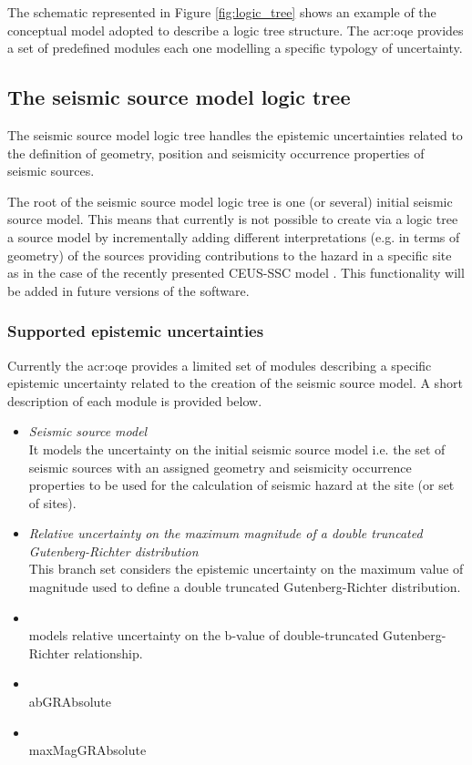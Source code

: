 The schematic represented in Figure \ref{fig:logic_tree} shows an example of 
the conceptual model adopted to describe a logic tree structure. The
\gls{acr:oqe} provides a set of predefined modules each one modelling a 
specific typology of uncertainty. 
%
\subsection{The seismic source model logic tree}
The seismic source model logic tree handles the epistemic uncertainties
related to the definition of geometry, position and seismicity occurrence 
properties of seismic sources. 

The root of the seismic source model logic tree is one (or several) initial 
seismic source model. This means that currently is not possible to create via 
a logic tree a source model by incrementally adding different 
interpretations (e.g. in terms  of geometry) of the sources providing 
contributions to the hazard in a specific site as in the case of the 
recently presented CEUS-SSC model \parencite{ceus2012}. 
%
This functionality will be added in future versions of the software.
%
\subsubsection{Supported epistemic uncertainties}
Currently the \gls{acr:oqe} provides a limited set of modules describing a 
specific epistemic uncertainty related to the creation of the seismic source 
model. A short description of each module is provided below.
\begin{itemize}
    \item \emph{Seismic source model} \hfill \\
        It models the uncertainty on the initial seismic source model i.e.
        the set of seismic sources with an assigned geometry and seismicity 
        occurrence properties to be used for the calculation of seismic 
        hazard at the site (or set of sites).
    \item \emph{Relative uncertainty on the maximum magnitude of a double 
            truncated Gutenberg-Richter distribution} \hfill \\ 
        This branch set considers the epistemic uncertainty on the maximum 
        value of magnitude used to define a double truncated Gutenberg-Richter 
        distribution.
    \item \emph{} \hfill \\
        models relative uncertainty on the b-value of double-truncated
        Gutenberg-Richter relationship.
    \item \emph{} \hfill \\ 
        abGRAbsolute
    \item \emph{} \hfill \\ 
        maxMagGRAbsolute
\end{itemize}
%
